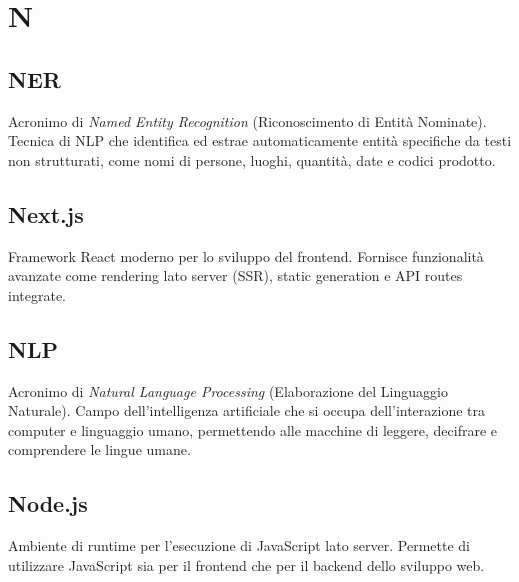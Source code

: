 \documentclass[a4paper, 11pt, oneside]{scrartcl} %
\begin{document}

\section*{N}


\subsection*{NER}
Acronimo di \textit{Named Entity Recognition} (Riconoscimento di Entità Nominate). Tecnica di NLP che identifica ed estrae automaticamente entità specifiche da testi non strutturati, come nomi di persone, luoghi, quantità, date e codici prodotto.
\vspace{0.5cm}

\subsection*{Next.js}


Framework React moderno per lo sviluppo del frontend. Fornisce funzionalità avanzate come rendering lato server (SSR), static generation e API routes integrate.

\vspace{0.5cm}

\subsection*{NLP}
Acronimo di \textit{Natural Language Processing} (Elaborazione del Linguaggio Naturale). Campo dell'intelligenza artificiale che si occupa dell'interazione tra computer e linguaggio umano, permettendo alle macchine di leggere, decifrare e comprendere le lingue umane.
\vspace{0.5cm}

\subsection*{Node.js}


Ambiente di runtime per l'esecuzione di JavaScript lato server. Permette di utilizzare JavaScript sia per il frontend che per il backend dello sviluppo web.

\vspace{0.5cm}
\end{document}
